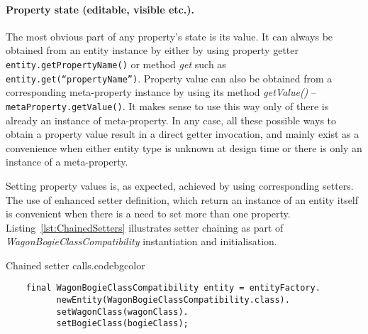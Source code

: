   \paragraph*{Property state (editable, visible etc.).}
  The most obvious part of any property's state is its value.
  It can always be obtained from an entity instance by either by using property getter \texttt{entity.getPropertyName()} or method \emph{get} such as \texttt{entity.get(``propertyName'')}.
  Property value can also be obtained from a corresponding meta-property instance by using its method \emph{getValue()} -- \texttt{metaProperty.getValue()}.
  It makes sense to use this way only of there is already an instance of meta-property.
  In any case, all these possible ways to obtain a property value result in a direct getter invocation, and mainly exist as a convenience when either entity type is unknown at design time or there is only an instance of a meta-property.
  
  Setting property values is, as expected, achieved by using corresponding setters.
  The use of enhanced setter definition, which return an instance of an entity itself is convenient when there is a need to set more than one property.
  Listing~\ref{lst:ChainedSetters} illustrates setter chaining as part of \emph{WagonBogieClassCompatibility} instantiation and initialisation.

  \begin{code}{Chained setter calls.}{\label{lst:ChainedSetters}}{codebgcolor}
    \begin{lstlisting}
    final WagonBogieClassCompatibility entity = entityFactory.
		  newEntity(WagonBogieClassCompatibility.class).
		  setWagonClass(wagonClass).
		  setBogieClass(bogieClass);
    \end{lstlisting}
  \end{code}


